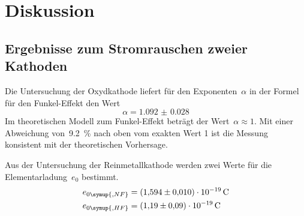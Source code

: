 \section{Diskussion}
\label{sec:diskussion}

\subsection{Ergebnisse zum Stromrauschen zweier Kathoden}

Die Untersuchung der Oxydkathode liefert für den Exponenten~$\alpha$ in der
Formel für den Funkel-Effekt den Wert
%
\begin{equation}
  \alpha=\num{1.092(28)}
\end{equation}
%
Im theoretischen Modell zum Funkel-Effekt beträgt der Wert~$\alpha\approx 1$.
Mit einer Abweichung von~\SI{9.2}{\percent} nach oben vom exakten Wert 1 ist die
Messung konsistent mit der theoretischen Vorhersage.

Aus der Untersuchung der Reinmetallkathode werden zwei Werte für die
Elementarladung~$e_0$ bestimmt.
%
\begin{align}
  e_{0\symup{, NF}}&=\SI{1.594(10)e-19}{\coulomb} \\
  e_{0\symup{, HF}}&=\SI{1.19(9)e-19}{\coulomb}
\end{align}
%
\nocite{V57}
